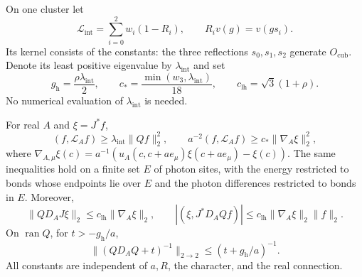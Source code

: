On one cluster let
\[
 \mathcal L_{\mathrm{int}}=\sum_{i=0}^2w_i(1-R_i),
 \qquad R_iv(g)=v(gs_i).
\]
Its kernel consists of the constants: the three reflections
$s_0,s_1,s_2$ generate $O_{\mathrm{cub}}$. Denote its least positive
eigenvalue by $\lambda_{\mathrm{int}}$ and set
\[
 g_{\mathrm h}=\frac{\rho\lambda_{\mathrm{int}}}{2},\qquad
 c_* =\frac{\min(w_3,\lambda_{\mathrm{int}})}{18},\qquad
 c_{\mathrm{lh}}=\sqrt3(1+\rho).
\]
No numerical evaluation of $\lambda_{\mathrm{int}}$ is needed.

\begin{proposition}\label{prop:cluster-energy}
For real $A$ and $\xi=J^*f$,
\begin{equation}\label{eq:cluster-energy}
 (f,\mathcal L_Af)\ge\lambda_{\mathrm{int}}\|Qf\|_2^2,
 \qquad
 a^{-2}(f,\mathcal L_Af)\ge c_*\|\nabla_A\xi\|_2^2,
\end{equation}
where
$\nabla_{A,\mu}\xi(c)=a^{-1}(u_A(c,c+ae_\mu)\xi(c+ae_\mu)-\xi(c))$.
The same inequalities hold on a finite set $E$ of photon sites, with the
energy restricted to bonds whose endpoints lie over $E$ and the photon
differences restricted to bonds in $E$. Moreover,
\begin{equation}\label{eq:offdiagonal-bound}
 \|QD_AJ\xi\|_2\le c_{\mathrm{lh}}\|\nabla_A\xi\|_2,
 \qquad
 |(\xi,J^*D_AQf)|\le
 c_{\mathrm{lh}}\|\nabla_A\xi\|_2\|f\|_2.
\end{equation}
On $\operatorname{ran}Q$, for $t>-g_{\mathrm h}/a$,
\begin{equation}\label{eq:heavy-inverse}
 \|(QD_AQ+t)^{-1}\|_{2\to2}\le(t+g_{\mathrm h}/a)^{-1}.
\end{equation}
All constants are independent of $a,R$, the character, and the real
connection.
\end{proposition}

